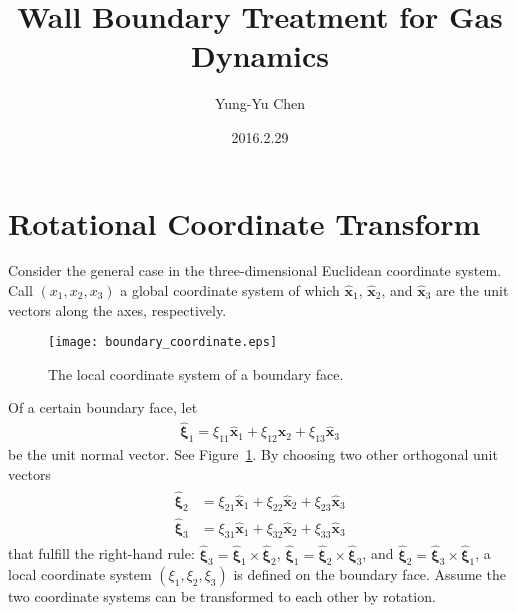 \documentclass[a4paper,12pt,dvips]{article}
\begin{document}
\title{Wall Boundary Treatment for Gas Dynamics}
\author{Yung-Yu Chen}
\date{2016.2.29}

\maketitle

\tableofcontents

\hspace{.5cm}

\section{Rotational Coordinate Transform}

Consider the general case in the three-dimensional Euclidean coordinate system.
Call $(x_1, x_2, x_3)$ a global coordinate system of which
%
$\hat{\mathbf{x}}_1$, $\hat{\mathbf{x}}_2$, and $\hat{\mathbf{x}}_3$
%
are the unit vectors along the axes, respectively.

\begin{figure}[htbp]
\centering
\texttt{[image: boundary\_coordinate.eps]}
\caption{The local coordinate system of a boundary face.}
\label{f:boundary_coordinate}
\end{figure}

Of a certain boundary face, let
%
\begin{align}
  \hat{\boldsymbol{\xi}}_1
  = \xi_{11} \hat{\mathbf{x}}_1
  + \xi_{12} \hat{\mathbf{x}}_2
  + \xi_{13} \hat{\mathbf{x}}_3
  \label{e:coord:xi1}
\end{align}
%
be the unit normal vector.  See Figure~\ref{f:boundary_coordinate}.  By
choosing two other orthogonal unit vectors
%
\begin{align}
\begin{aligned}
  \hat{\boldsymbol{\xi}}_2
 &= \xi_{21} \hat{\mathbf{x}}_1
  + \xi_{22} \hat{\mathbf{x}}_2
  + \xi_{23} \hat{\mathbf{x}}_3
  \\
  \hat{\boldsymbol{\xi}}_3
 &= \xi_{31} \hat{\mathbf{x}}_1
  + \xi_{32} \hat{\mathbf{x}}_2
  + \xi_{33} \hat{\mathbf{x}}_3
\end{aligned}
\label{e:coord:xi23}
\end{align}
%
that fulfill the right-hand rule:
%
$\hat{\boldsymbol{\xi}}_3 = \hat{\boldsymbol{\xi}}_1 \times
\hat{\boldsymbol{\xi}}_2$,
%
$\hat{\boldsymbol{\xi}}_1 = \hat{\boldsymbol{\xi}}_2 \times
\hat{\boldsymbol{\xi}}_3$, and
%
$\hat{\boldsymbol{\xi}}_2 = \hat{\boldsymbol{\xi}}_3 \times
\hat{\boldsymbol{\xi}}_1$,
%
a local coordinate system $(\xi_1, \xi_2, \xi_3)$ is defined on the boundary
face.  Assume the two coordinate systems can be transformed to each other by
rotation.
\end{document}
